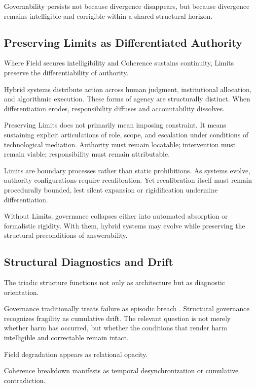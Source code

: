 \documentclass[12pt]{article}
\begin{document}
Governability persists not because divergence disappears, but because divergence remains intelligible and corrigible within a shared structural horizon.

\subsection{Preserving Limits as Differentiated Authority}


Where Field secures intelligibility and Coherence sustains continuity, Limits preserve the differentiability of authority.

Hybrid systems distribute action across human judgment, institutional allocation, and algorithmic execution. These forms of agency are structurally distinct. When differentiation erodes, responsibility diffuses and accountability dissolves.

Preserving Limits does not primarily mean imposing constraint. It means sustaining explicit articulations of role, scope, and escalation under conditions of technological mediation. Authority must remain locatable; intervention must remain viable; responsibility must remain attributable.

Limits are boundary processes rather than static prohibitions. As systems evolve, authority configurations require recalibration. Yet recalibration itself must remain procedurally bounded, lest silent expansion or rigidification undermine differentiation.

Without Limits, governance collapses either into automated absorption or formalistic rigidity. With them, hybrid systems may evolve while preserving the structural preconditions of answerability.

\subsection{Structural Diagnostics and Drift}


The triadic structure functions not only as architecture but as diagnostic orientation.

Governance traditionally treats failure as episodic breach \citep{Floridi2018,Dignum2019}. Structural governance recognizes fragility as cumulative drift. The relevant question is not merely whether harm has occurred, but whether the conditions that render harm intelligible and correctable remain intact.

Field degradation appears as relational opacity.

Coherence breakdown manifests as temporal desynchronization or cumulative contradiction.
\end{document}
